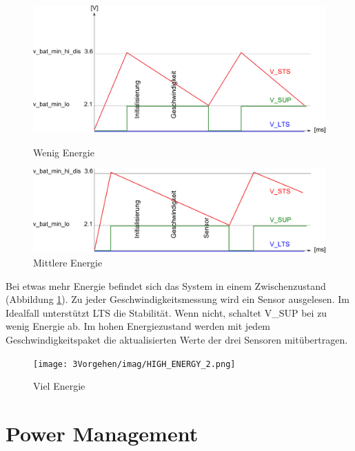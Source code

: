 \begin{figure}[ht]
    \begin{minipage}[t]{0.5\textwidth}
      \includegraphics[width=1.0\textwidth]{3Vorgehen/imag/LOW_ENERGY.png}
      \caption{Wenig Energie}
      \label{LOW_ENER}
    \end{minipage}
    \begin{minipage}[t]{0.5\textwidth}
      \includegraphics[width=1.0\textwidth]{3Vorgehen/imag/MIDDLE_ENERGY.png}
      \caption{Mittlere Energie}
      \label{MID_ENER}
    \end{minipage}
\end{figure}

Bei etwas mehr Energie befindet sich das System in einem Zwischenzustand (Abbildung \ref{MID_ENER}). Zu jeder Geschwindigkeitsmessung wird ein Sensor ausgelesen. Im Idealfall unterstützt LTS die Stabilität. Wenn nicht, schaltet V\_SUP bei zu wenig Energie ab. Im hohen Energiezustand werden mit jedem Geschwindigkeitspaket die aktualisierten Werte der drei Sensoren mitübertragen. 

\begin{figure}[ht]
  \texttt{[image: 3Vorgehen/imag/HIGH\_ENERGY\_2.png]}
  \caption{Viel Energie}
  \label{HIGH_ENER}
\end{figure}


\section{Power Management}
\label{powerOptimierung}

